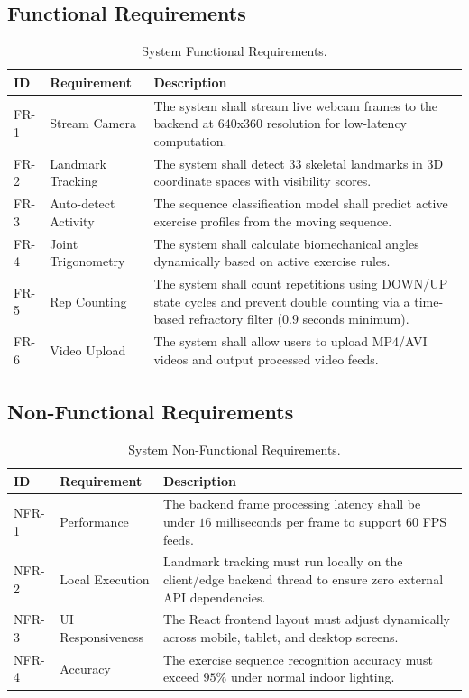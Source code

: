 \subsection{Functional Requirements}
\begin{table}[h]
\centering
\begin{tabular}{|p{1.2cm}|p{3.8cm}|p{10.8cm}|}
\hline
\textbf{ID} & \textbf{Requirement} & \textbf{Description} \\ \hline
FR-1 & Stream Camera & The system shall stream live webcam frames to the backend at 640x360 resolution for low-latency computation. \\ \hline
FR-2 & Landmark Tracking & The system shall detect 33 skeletal landmarks in 3D coordinate spaces with visibility scores. \\ \hline
FR-3 & Auto-detect Activity & The sequence classification model shall predict active exercise profiles from the moving sequence. \\ \hline
FR-4 & Joint Trigonometry & The system shall calculate biomechanical angles dynamically based on active exercise rules. \\ \hline
FR-5 & Rep Counting & The system shall count repetitions using DOWN/UP state cycles and prevent double counting via a time-based refractory filter ($0.9$ seconds minimum). \\ \hline
FR-6 & Video Upload & The system shall allow users to upload MP4/AVI videos and output processed video feeds. \\ \hline
\end{tabular}
\caption{System Functional Requirements.}
\label{tab:functional_requirements}
\end{table}

\subsection{Non-Functional Requirements}
\begin{table}[h]
\centering
\begin{tabular}{|p{1.5cm}|p{3.8cm}|p{10.5cm}|}
\hline
\textbf{ID} & \textbf{Requirement} & \textbf{Description} \\ \hline
NFR-1 & Performance & The backend frame processing latency shall be under $16$ milliseconds per frame to support $60$ FPS feeds. \\ \hline
NFR-2 & Local Execution & Landmark tracking must run locally on the client/edge backend thread to ensure zero external API dependencies. \\ \hline
NFR-3 & UI Responsiveness & The React frontend layout must adjust dynamically across mobile, tablet, and desktop screens. \\ \hline
NFR-4 & Accuracy & The exercise sequence recognition accuracy must exceed $95\%$ under normal indoor lighting. \\ \hline
\end{tabular}
\caption{System Non-Functional Requirements.}
\label{tab:non_functional_requirements}
\end{table}

